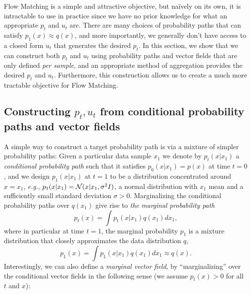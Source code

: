 \documentclass{article}
\makeatletter
\newcommand{\marginal}{marginal\@\xspace}
\renewcommand*{\eg}{{\it e.g.}\@\xspace}
\makeatother
\begin{document}
Flow Matching is a simple and attractive objective, but na\"ively on its own, it is intractable to use in practice since we have no prior knowledge for what an appropriate $p_t$ and $u_t$ are.
There are many choices of probability paths that can satisfy $p_1(x) \approx q(x)$, and more importantly, we generally don't have access to a closed form $u_t$ that generates the desired $p_t$. 
%
In this section, we show that we can construct both $p_t$ and $u_t$ using probability paths and vector fields that are only defined \emph{per sample}, and an appropriate method of aggregation provides the desired $p_t$ and $u_t$. 
Furthermore, this construction allows us to create a much more tractable objective for Flow Matching.

\subsection{Constructing $p_t,u_t$ from conditional probability paths and vector fields} 
A simple way to construct a target probability path is via a mixture of simpler probability paths: Given a particular data sample $x_1$ we denote by $p_t(x\vert x_1)$ a \emph{conditional probability path} 
such that it satisfies $p_0(x|x_1) = p(x)$ at time $t=0$, and we design $p_1(x|x_1)$ at $t=1$ to be a distribution concentrated around $x=x_1$, \eg, $p_1(x|x_1)={\mathcal{N}}(x|x_1,\sigma^2 I)$, a normal distribution with $x_1$ mean and a sufficiently small standard deviation $\sigma > 0$. 
Marginalizing the conditional probability paths over $q(x_1)$ give rise to \emph{the \marginal probability path}
\begin{equation}\label{e:p_t}
    p_t(x)=\int p_t(x|x_1)q(x_1)dx_1,
\end{equation}
where in particular at time $t=1$, the \marginal probability $p_1$ is a mixture distribution that closely approximates the data distribution $q$,
\begin{equation}\label{e:p_1} 
    p_1(x)=\int p_1(x|x_1)q(x_1)dx_1\approx q(x).
\end{equation}
%
Interestingly, we can also define a \emph{\marginal vector field}, by ``marginalizing'' over the conditional vector fields in the following sense (we assume $p_t(x)>0$ for all $t$ and $x$):
\end{document}
